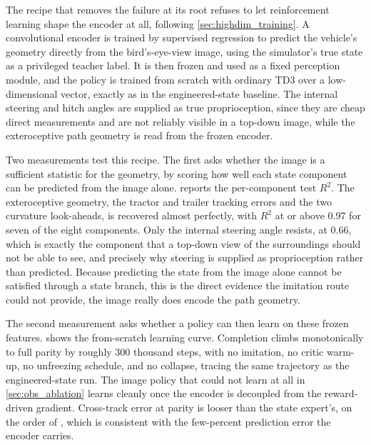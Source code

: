 The recipe that removes the failure at its root refuses to let reinforcement learning shape the encoder at all, following \cref{sec:highdim_training}. A convolutional encoder is trained by supervised regression to predict the vehicle's geometry directly from the bird's-eye-view image, using the simulator's true state as a privileged teacher label. It is then frozen and used as a fixed perception module, and the policy is trained from scratch with ordinary TD3 over a low-dimensional vector, exactly as in the engineered-state baseline. The internal steering and hitch angles are supplied as true proprioception, since they are cheap direct measurements and are not reliably visible in a top-down image, while the exteroceptive path geometry is read from the frozen encoder.

Two measurements test this recipe. The first asks whether the image is a sufficient statistic for the geometry, by scoring how well each state component can be predicted from the image alone.  reports the per-component test $R^2$. The exteroceptive geometry, the tractor and trailer tracking errors and the two curvature look-aheads, is recovered almost perfectly, with $R^2$ at or above 0.97 for seven of the eight components. Only the internal steering angle resists, at 0.66, which is exactly the component that a top-down view of the surroundings should not be able to see, and precisely why steering is supplied as proprioception rather than predicted. Because predicting the state from the image alone cannot be satisfied through a state branch, this is the direct evidence the imitation route could not provide, the image really does encode the path geometry.



The second measurement asks whether a policy can then learn on these frozen features.  shows the from-scratch learning curve. Completion climbs monotonically to full parity by roughly 300 thousand steps, with no imitation, no critic warm-up, no unfreezing schedule, and no collapse, tracing the same trajectory as the engineered-state run. The image policy that could not learn at all in \cref{sec:obs_ablation} learns cleanly once the encoder is decoupled from the reward-driven gradient. Cross-track error at parity is looser than the state expert's, on the order of , which is consistent with the few-percent prediction error the encoder carries.

